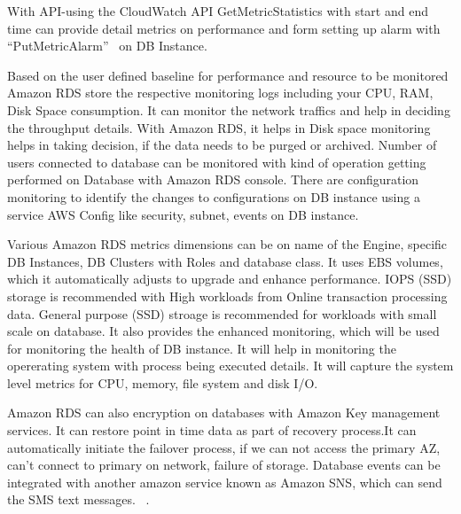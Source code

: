 With API-using the CloudWatch API GetMetricStatistics with start and end time 
can provide detail metrics on performance and form setting up alarm 
with ``PutMetricAlarm''~\cite{hid-sp18-520-amardsmon} on DB Instance.

Based on the user defined baseline for performance and resource to be monitored 
Amazon RDS store the respective monitoring logs including your CPU, RAM, Disk 
Space consumption. It can monitor the network traffics and help in deciding 
the throughput details. With Amazon RDS, it helps in Disk space monitoring 
helps in taking decision, if the data needs to be purged or archived.
Number of users connected to database can be monitored with kind of operation 
getting performed on Database with Amazon RDS console. There are configuration
monitoring to identify the changes to configurations on DB instance using a 
service AWS Config like security, subnet, events on DB instance.

Various Amazon RDS metrics dimensions can be on name of the Engine, specific 
DB Instances, DB Clusters with Roles and database class. 
It uses EBS volumes, which it automatically adjusts to upgrade and 
enhance performance.
IOPS (SSD) storage is recommended with High workloads from Online 
transaction processing data.
General purpose (SSD) stroage is recommended for workloads with small
scale on database.
It also provides the enhanced monitoring, which will be used for monitoring 
the health of DB instance. It will help in monitoring the opererating system 
with process being executed details. It will capture the system level metrics 
for CPU, memory, file system and disk I/O.


Amazon RDS can also encryption on databases with Amazon Key management services. 
It can restore point in time data as part of recovery process.It can 
automatically initiate the failover process, if we can not access the 
primary AZ, can't connect to primary on network, failure of storage.
Database events can be integrated with another amazon service known as
Amazon SNS, which can send the SMS text messages.
~\cite{hid-sp18-520-amardsmon}.

